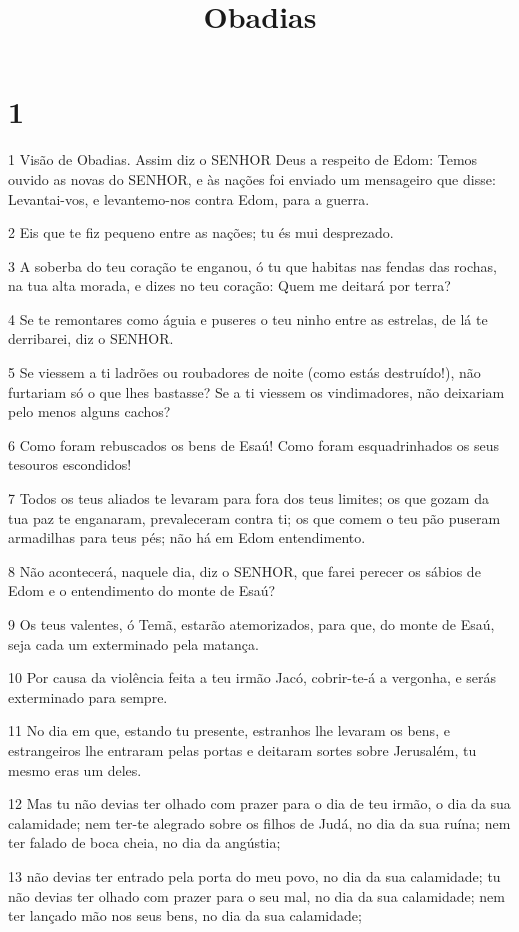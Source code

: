 

\title{Obadias}


\chapter{1}

\par 1 Visão de Obadias. Assim diz o SENHOR Deus a respeito de Edom: Temos ouvido as novas do SENHOR, e às nações foi enviado um mensageiro que disse: Levantai-vos, e levantemo-nos contra Edom, para a guerra.
\par 2 Eis que te fiz pequeno entre as nações; tu és mui desprezado.
\par 3 A soberba do teu coração te enganou, ó tu que habitas nas fendas das rochas, na tua alta morada, e dizes no teu coração: Quem me deitará por terra?
\par 4 Se te remontares como águia e puseres o teu ninho entre as estrelas, de lá te derribarei, diz o SENHOR.
\par 5 Se viessem a ti ladrões ou roubadores de noite (como estás destruído!), não furtariam só o que lhes bastasse? Se a ti viessem os vindimadores, não deixariam pelo menos alguns cachos?
\par 6 Como foram rebuscados os bens de Esaú! Como foram esquadrinhados os seus tesouros escondidos!
\par 7 Todos os teus aliados te levaram para fora dos teus limites; os que gozam da tua paz te enganaram, prevaleceram contra ti; os que comem o teu pão puseram armadilhas para teus pés; não há em Edom entendimento.
\par 8 Não acontecerá, naquele dia, diz o SENHOR, que farei perecer os sábios de Edom e o entendimento do monte de Esaú?
\par 9 Os teus valentes, ó Temã, estarão atemorizados, para que, do monte de Esaú, seja cada um exterminado pela matança.
\par 10 Por causa da violência feita a teu irmão Jacó, cobrir-te-á a vergonha, e serás exterminado para sempre.
\par 11 No dia em que, estando tu presente, estranhos lhe levaram os bens, e estrangeiros lhe entraram pelas portas e deitaram sortes sobre Jerusalém, tu mesmo eras um deles.
\par 12 Mas tu não devias ter olhado com prazer para o dia de teu irmão, o dia da sua calamidade; nem ter-te alegrado sobre os filhos de Judá, no dia da sua ruína; nem ter falado de boca cheia, no dia da angústia;
\par 13 não devias ter entrado pela porta do meu povo, no dia da sua calamidade; tu não devias ter olhado com prazer para o seu mal, no dia da sua calamidade; nem ter lançado mão nos seus bens, no dia da sua calamidade;

